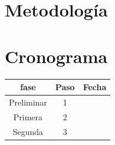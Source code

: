\documentclass[UTF8]{article}
\begin{document}


\section{Metodología}



\section{Cronograma}

\begin{table}[h]
\begin{center}
\begin{tabular}{|c|c|c|}
\hline
fase&Paso&Fecha\\
\hline
Preliminar&1& \\
\hline
Primera&2& \\
\hline
Segunda&3& \\
\hline
\end{tabular}
\end{center}
\end{table}
\end{document}
